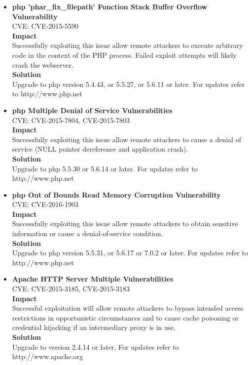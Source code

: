 \begin{itemize}
\item \textbf{php 'phar\_fix\_filepath' Function Stack Buffer Overflow Vulnerability} \\
CVE: CVE-2015-5590\\

\textbf{Impact} \\
Successfully exploiting this issue allow remote attackers to execute arbitrary code in the context of the PHP process. Failed exploit attempts will likely crash the webserver.\\

\textbf{Solution}\\
Upgrade to php version 5.4.43, or 5.5.27, or 5.6.11 or later. For updates refer to http://www.php.net\\

\item \textbf{php Multiple Denial of Service Vulnerabilities} \\
CVE: CVE-2015-7804, CVE-2015-7803\\

\textbf{Impact} \\
Successfully exploiting this issue allow remote attackers to cause a denial of service (NULL pointer dereference and application crash).\\

\textbf{Solution}\\
Upgrade to php 5.5.30 or 5.6.14 or later. For updates refer to http://www.php.net\\

\item \textbf{php Out of Bounds Read Memory Corruption Vulnerability} \\
CVE: CVE-2016-1903\\

\textbf{Impact} \\
Successfully exploiting this issue allow remote attackers to obtain sensitive information or cause a denial-of-service condition.\\

\textbf{Solution}\\
Upgrade to php version 5.5.31, or 5.6.17 or 7.0.2 or later. For updates refer to http://www.php.net\\


\item \textbf{Apache HTTP Server Multiple Vulnerabilities} \\
CVE: CVE-2015-3185, CVE-2015-3183\\

\textbf{Impact} \\
Successful exploitation will allow remote attackers to bypass intended access restrictions in opportunistic circumstances and to cause cache poisoning or credential hijacking if an intermediary proxy is in use.\\

\textbf{Solution}\\
Upgrade to version 2.4.14 or later, For updates refer to http://www.apache.org\\
\end{itemize}